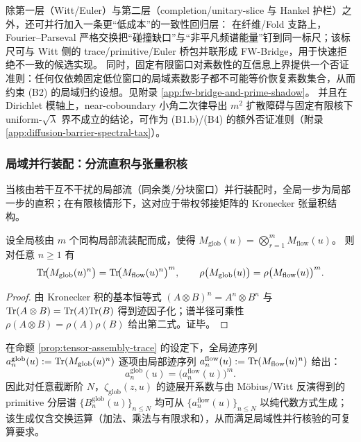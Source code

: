 \begin{remark}\label{rem:third-layer-fw-prime-shadow}
除第一层（Witt/Euler）与第二层（completion/unitary-slice 与 Hankel 护栏）之外，还可并行加入一条更“低成本”的一致性回归层：
在纤维/Fold 支路上，Fourier--Parseval 严格交换把“碰撞缺口”与“非平凡频谱能量”钉到同一标尺；该标尺可与 Witt 侧的 trace/primitive/Euler 桥包并联形成 FW-Bridge，用于快速拒绝不一致的候选实现。
同时，固定有限窗口对素数性的互信息上界提供一个否证准则：任何仅依赖固定低位窗口的局域素数影子都不可能等价恢复素数集合，从而约束 (B2) 的局域归约设想。见附录 \ref{app:fw-bridge-and-prime-shadow}。
并且在 Dirichlet 模轴上，near-coboundary 小角二次律导出 \(m^2\) 扩散障碍与固定有限核下 uniform-\(\sqrt{\lambda}\) 界不成立的结论，可作为 (B1.b)/(B4) 的额外否证准则（附录 \ref{app:diffusion-barrier-spectral-tax}）。
\end{remark}

\subsubsection{局域并行装配：分流直积与张量积核}\label{subsubsec:parallel-tensor}
当核由若干互不干扰的局部流（同余类/分块窗口）并行装配时，全局一步为局部一步的直积；在有限核情形下，这对应于带权邻接矩阵的 Kronecker 张量积结构。

\begin{proposition}[张量积装配的谱半径与迹因子化]\label{prop:tensor-assembly-trace}
设全局核由 $m$ 个同构局部流装配而成，使得
$
M_{\mathrm{glob}}(u)=\bigotimes_{r=1}^{m}M_{\mathrm{flow}}(u)
$。
则对任意 $n\ge 1$ 有
$$
\mathrm{Tr}\!\bigl(M_{\mathrm{glob}}(u)^n\bigr)=\mathrm{Tr}\!\bigl(M_{\mathrm{flow}}(u)^n\bigr)^m,
\qquad
\rho\bigl(M_{\mathrm{glob}}(u)\bigr)=\rho\bigl(M_{\mathrm{flow}}(u)\bigr)^m.
$$
\end{proposition}
\begin{proof}
由 Kronecker 积的基本恒等式 $(A\otimes B)^n=A^n\otimes B^n$ 与 $\mathrm{Tr}(A\otimes B)=\mathrm{Tr}(A)\mathrm{Tr}(B)$ 得到迹因子化；谱半径可乘性 $\rho(A\otimes B)=\rho(A)\rho(B)$ 给出第二式。证毕。
\end{proof}

\begin{corollary}\label{cor:parallel-audit-factorization}
在命题 \ref{prop:tensor-assembly-trace} 的设定下，全局迹序列 $a^{\mathrm{glob}}_n(u):=\mathrm{Tr}(M_{\mathrm{glob}}(u)^n)$ 逐项由局部迹序列 $a^{\mathrm{flow}}_n(u):=\mathrm{Tr}(M_{\mathrm{flow}}(u)^n)$ 给出：
$$
a^{\mathrm{glob}}_n(u)=\bigl(a^{\mathrm{flow}}_n(u)\bigr)^m.
$$
因此对任意截断阶 $N$，$\zeta_{\mathrm{glob}}(z,u)$ 的迹展开系数与由 Möbius/Witt 反演得到的 primitive 分层谱 $\{B^{\mathrm{glob}}_n(u)\}_{n\le N}$ 均可从 $\{a^{\mathrm{flow}}_n(u)\}_{n\le N}$ 以纯代数方式生成；该生成仅含交换运算（加法、乘法与有限求和），从而满足局域性并行核验的可复算要求。
\end{corollary}

